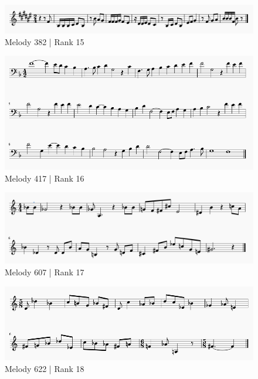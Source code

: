 \documentclass[12pt,]{book}
\begin{document}
\begin{figure}

{\centering \includegraphics[width=1\linewidth]{img/survey_melodies/Berkowitz382t} 

}

\caption{Melody 382 | Rank 15}\label{fig:berk382}
\end{figure}

\begin{figure}

{\centering \includegraphics[width=1\linewidth]{img/survey_melodies/Berkowitz417tx} 

}

\caption{Melody 417 | Rank 16}\label{fig:berk417tx}
\end{figure}

\begin{figure}

{\centering \includegraphics[width=1\linewidth]{img/survey_melodies/Berkowitz607tx} 

}

\caption{Melody 607 | Rank 17}\label{fig:berk607tx}
\end{figure}

\begin{figure}

{\centering \includegraphics[width=1\linewidth]{img/survey_melodies/Berkowitz622} 

}

\caption{Melody 622 | Rank 18}\label{fig:berk622}
\end{figure}
\end{document}
